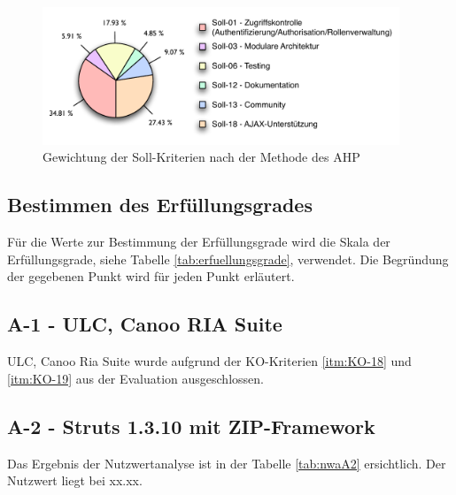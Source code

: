   \begin{figure}[ht]
    \begin{center}
      \includegraphics[width=0.95\textwidth]{./image/gewichtungSollKriterien.pdf}
      \caption{Gewichtung der Soll-Kriterien nach der Methode des AHP}
      \label{img:gewichtungSollKriterien}
    \end{center}
  \end{figure}
  
  \subsection{Bestimmen des Erfüllungsgrades}
  
  Für die Werte zur Bestimmung der Erfüllungsgrade wird die Skala der
  Erfüllungsgrade, siehe Tabelle \ref{tab:erfuellungsgrade}, verwendet. Die
  Begründung der gegebenen Punkt wird für jeden Punkt erläutert.
  
  \subsection{A-1 - ULC, Canoo RIA Suite}
  
  ULC, Canoo Ria Suite wurde aufgrund der KO-Kriterien \ref{itm:KO-18} und
  \ref{itm:KO-19} aus der Evaluation ausgeschlossen.
  
  \subsection{A-2 - Struts 1.3.10 mit ZIP-Framework}
  
  Das Ergebnis der Nutzwertanalyse ist in der Tabelle \ref{tab:nwaA2}
  ersichtlich. Der Nutzwert liegt bei xx.xx.
  

